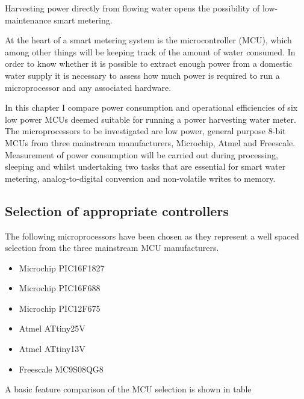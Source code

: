 
Harvesting power directly from flowing water opens the possibility of low-maintenance smart metering.


At the heart of a smart metering system is the microcontroller (MCU),
which among other things will be keeping track of the amount of water
consumed. In order to know whether it is possible to extract enough
power from a domestic water supply it is necessary to assess how much
power is required to run a microprocessor and any associated hardware.

In this chapter I compare power consumption and operational efficiencies
of six low power MCUs deemed suitable for running a power harvesting
water meter. The microprocessors to be investigated are low power,
general purpose 8-bit MCUs from three mainstream manufacturers, Microchip,
Atmel and Freescale. Measurement of power consumption will be carried
out during processing, sleeping and whilst undertaking two tasks that
are essential for smart water metering, analog-to-digital conversion
and non-volatile writes to memory.


\subsection{Selection of appropriate controllers}

The following microprocessors have been chosen as they represent a
well spaced selection from the three mainstream MCU manufacturers.
\begin{itemize}
\item Microchip PIC16F1827
\item Microchip PIC16F688
\item Microchip PIC12F675
\item Atmel ATtiny25V
\item Atmel ATtiny13V
\item Freescale MC9S08QG8
\end{itemize}
A basic feature comparison of the MCU selection is shown in table

